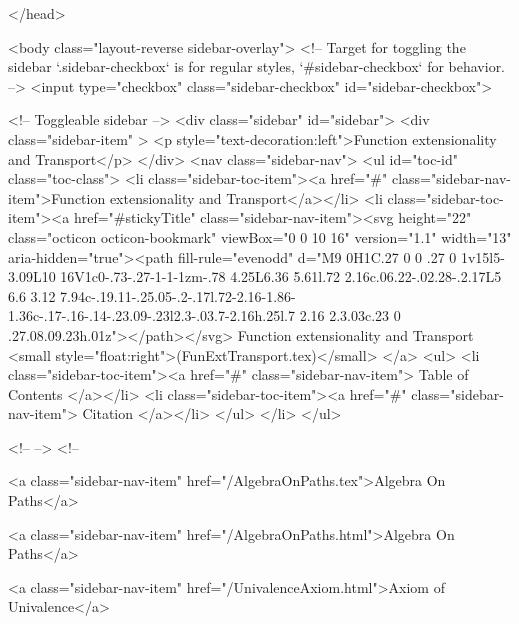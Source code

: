 </head>


  <body class="layout-reverse sidebar-overlay">
    <!-- Target for toggling the sidebar `.sidebar-checkbox` is for regular
     styles, `#sidebar-checkbox` for behavior. -->
<input type="checkbox" class="sidebar-checkbox" id="sidebar-checkbox">

<!-- Toggleable sidebar -->
<div class="sidebar" id="sidebar">
  <div class="sidebar-item" >
    <p style="text-decoration:left">Function extensionality and Transport</p>
  </div>
  <nav class="sidebar-nav">
    <ul id="toc-id" class="toc-class">
  <li class="sidebar-toc-item"><a href="#" class="sidebar-nav-item">Function extensionality and Transport</a></li>
  <li class="sidebar-toc-item"><a href="#stickyTitle" class="sidebar-nav-item"><svg height="22" class="octicon octicon-bookmark" viewBox="0 0 10 16" version="1.1" width="13" aria-hidden="true"><path fill-rule="evenodd" d="M9 0H1C.27 0 0 .27 0 1v15l5-3.09L10 16V1c0-.73-.27-1-1-1zm-.78 4.25L6.36 5.61l.72 2.16c.06.22-.02.28-.2.17L5 6.6 3.12 7.94c-.19.11-.25.05-.2-.17l.72-2.16-1.86-1.36c-.17-.16-.14-.23.09-.23l2.3-.03.7-2.16h.25l.7 2.16 2.3.03c.23 0 .27.08.09.23h.01z"></path></svg> Function extensionality and Transport <small style="float:right">(FunExtTransport.tex)</small>
</a>
    <ul>
      <li class="sidebar-toc-item"><a href="#" class="sidebar-nav-item"> Table of Contents </a></li>
      <li class="sidebar-toc-item"><a href="#" class="sidebar-nav-item"> Citation </a></li>
    </ul>
  </li>
</ul>


    <!--  -->
    <!-- 
      
    
      
    
      
    
      
        
      
    
      
        
          <a class="sidebar-nav-item" href="/AlgebraOnPaths.tex">Algebra On Paths</a>
        
      
    
      
        
          <a class="sidebar-nav-item" href="/AlgebraOnPaths.html">Algebra On Paths</a>
        
      
    
      
        
          <a class="sidebar-nav-item" href="/UnivalenceAxiom.html">Axiom of Univalence</a>
        
      
    
      
        
